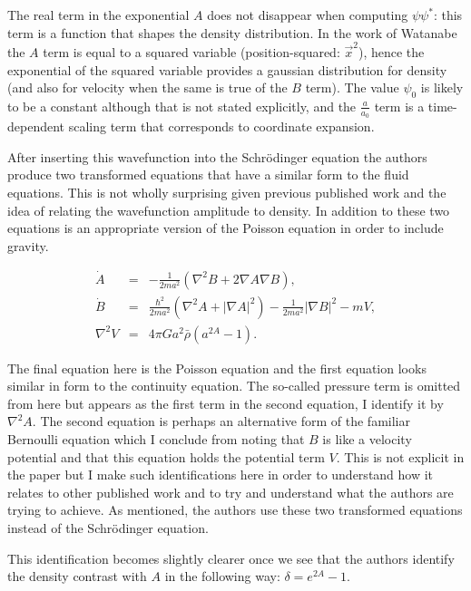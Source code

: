 The real term in the exponential $A$ does not disappear when computing $\psi\psi^*$: this term is a function that shapes the density distribution. In the work of Watanabe \citep{bib_wat} the $A$ term is equal to a squared variable (position-squared: ${\vec x}^2$), hence the exponential of the squared variable provides a gaussian distribution for density (and also for velocity when the same is true of the $B$ term). The value $\psi_0$ is likely to be a constant although that is not stated explicitly, and the $\frac{a}{a_0}$ term is a time-dependent scaling term that corresponds to coordinate expansion.

After inserting this wavefunction into the Schr\"odinger equation the authors produce two transformed equations that have a similar form to the fluid equations. This is not wholly surprising given previous published work and the idea of relating the wavefunction amplitude to density. In addition to these two equations is an appropriate version of the Poisson equation in order to include gravity.

\begin{eqnarray}
\dot{A} &=& -\frac{1}{2ma^2}(\nabla^2 B + 2\nabla A\nabla B),\\
\dot{B} &=& \frac{\hbar^2}{2ma^2}(\nabla^2 A + |\nabla A|^2) - \frac{1}{2ma^2}|\nabla B|^2 -m V, \\
\nabla^2 V &=& 4\pi Ga^2\bar{\rho}(a^{2A}  - 1).
\end{eqnarray}

\noindent The final equation here is the Poisson equation and the first equation looks similar in form to the continuity equation. The so-called pressure term is omitted from here but appears as the first term in the second equation, I identify it by $\nabla^2 A$. The second equation is perhaps an alternative form of the familiar Bernoulli equation which I conclude from noting that $B$ is like a velocity potential and that this equation holds the potential term $V$. This is not explicit in the paper but I make such identifications here in order to understand how it relates to other published work and to try and understand what the authors are trying to achieve. As mentioned, the authors use these two transformed equations instead of the Schr\"odinger equation.

This identification becomes slightly clearer once we see that the authors identify the density contrast with $A$ in the following way: $\delta = e^{2A} -1$.

